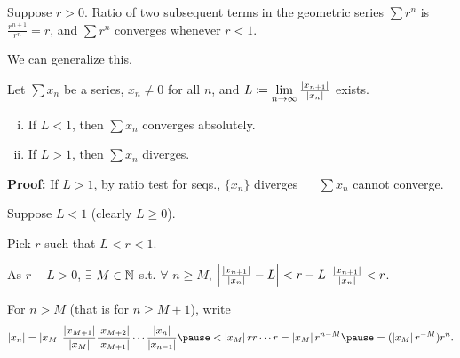 \documentclass[10pt,aspectratio=149]{beamer}
\begin{document}
\begin{frame}
Suppose $r > 0$.  Ratio of two subsequent terms in the geometric series $\sum
r^n$ is $\frac{r^{n+1}}{r^n} = r$, and $\sum r^n$ converges
whenever $r < 1$.

\pause
\medskip

We can generalize this.

\begin{proposition}
Let $\sum x_n$ be a series, $x_n \not= 0$ for all $n$, and \quad
$L \coloneqq \lim\limits_{n\to\infty} \frac{\left\lvert {x_{n+1}} \right\rvert}{\left\lvert {x_n} \right\rvert}$ \quad exists.
\begin{enumerate}[(i)]
\item
\pause
If $L < 1$, then $\sum x_n$ converges absolutely.
\item
\pause
If $L > 1$, then $\sum x_n$ diverges.
\end{enumerate}
\end{proposition}

\pause
\textbf{Proof:}
If $L > 1$, by ratio test for seqs., $\{ x_n \}$ diverges ~\thus~
$\sum x_n$ cannot converge.

\pause
\medskip

Suppose $L < 1$ (clearly $L \geq 0$).

\pause
Pick $r$ such that $L < r < 1$.

\pause
\medskip

As $r-L > 0$, $\exists$ $M \in {\mathbb{N}}$ s.t. $\forall$ $n \geq M$,
\quad
$\left\lvert {\frac{\left\lvert {x_{n+1}} \right\rvert}{\left\lvert {x_n} \right\rvert} - L} \right\rvert < r-L$
\wthus
$\frac{\left\lvert {x_{n+1}} \right\rvert}{\left\lvert {x_n} \right\rvert} < r$.

\pause
\medskip

For $n > M$ (that is for $n \geq M+1$),
write
\begin{equation*}
\abs{x_n} =
\abs{x_M}
\frac{\abs{x_{M+1}}}{\abs{x_{M}}}
\frac{\abs{x_{M+2}}}{\abs{x_{M+1}}}
\cdots
\frac{\abs{x_{n}}}{\abs{x_{n-1}}}
\pause
<
\abs{x_M}
r r \cdots r = \abs{x_M} r^{n-M}
\pause
= (\abs{x_M} r^{-M}) r^n .
\end{equation*}

\end{frame}
\end{document}

